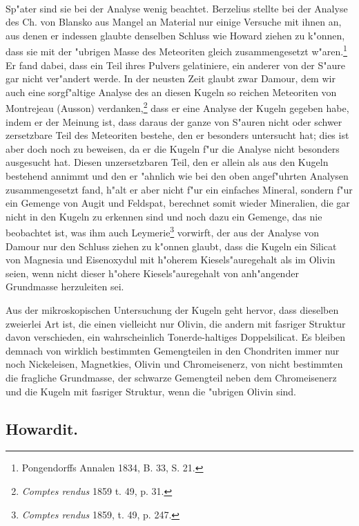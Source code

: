 \documentclass[a4paper, 11pt, oneside, german]{article}
\begin{document}
\paragraph{}
Sp"ater sind sie bei der Analyse wenig beachtet. Berzelius stellte bei der Analyse des Ch. von Blansko aus Mangel an Material nur einige Versuche mit ihnen an, aus denen er indessen glaubte denselben Schluss wie Howard ziehen zu k"onnen, dass sie mit der "ubrigen Masse des Meteoriten gleich zusammengesetzt w"aren.\footnote{Pongendorffs Annalen 1834, B. 33, S. 21.} Er fand dabei, dass ein Teil ihres Pulvers gelatiniere, ein anderer von der S"aure gar nicht ver"andert werde. In der neusten Zeit glaubt zwar Damour, dem wir auch eine sorgf"altige Analyse des an diesen Kugeln so reichen Meteoriten von Montrejeau (Ausson) verdanken,\footnote{\emph{Comptes rendus} 1859 t. 49, p. 31.} dass er eine Analyse der Kugeln gegeben habe, indem er der Meinung ist, dass daraus der ganze von S"auren nicht oder schwer zersetzbare Teil des Meteoriten bestehe, den er besonders untersucht hat; dies ist aber doch noch zu beweisen, da er die Kugeln f"ur die Analyse nicht besonders ausgesucht hat. Diesen unzersetzbaren Teil, den er allein als aus den Kugeln bestehend annimmt und den er "ahnlich wie bei den oben angef"uhrten Analysen zusammengesetzt fand, h"alt er aber nicht f"ur ein einfaches Mineral, sondern f"ur ein Gemenge von Augit und Feldspat, berechnet somit wieder Mineralien, die gar nicht in den Kugeln zu erkennen sind und noch dazu ein Gemenge, das nie beobachtet ist, was ihm auch Leymerie\footnote{\emph{Comptes rendus} 1859, t. 49, p. 247.} vorwirft, der aus der Analyse von Damour nur den Schluss ziehen zu k"onnen glaubt, dass die Kugeln ein Silicat von Magnesia und Eisenoxydul mit h"oherem Kiesels"auregehalt als im Olivin seien, wenn nicht dieser h"ohere Kiesels"auregehalt von anh"angender Grundmasse herzuleiten sei.

Aus der mikroskopischen Untersuchung der Kugeln geht hervor, dass dieselben zweierlei Art ist, die einen vielleicht nur Olivin, die andern mit fasriger Struktur davon verschieden, ein wahrscheinlich Tonerde-haltiges Doppelsilicat. Es bleiben demnach von wirklich bestimmten Gemengteilen in den Chondriten immer nur noch Nickeleisen, Magnetkies, Olivin und Chromeisenerz, von nicht bestimmten die fragliche Grundmasse, der schwarze Gemengteil neben dem Chromeisenerz und die Kugeln mit fasriger Struktur, wenn die "ubrigen Olivin sind.
\subsection{Howardit.}
\end{document}
